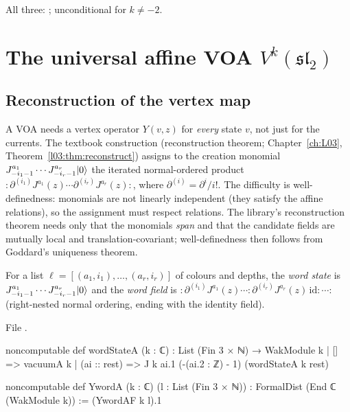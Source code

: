 \begin{status}
All three: \lean{[propext, Classical.}\allowbreak{}\allowbreak\lean{sound]}; unconditional for $k\ne-2$.
\end{status}

\section{The universal affine VOA \texorpdfstring{$V^k(\mathfrak{sl}_2)$}{V\^{}k(sl2)}}\label{l08:sec:voa}

\subsection{Reconstruction of the vertex map}

A VOA needs a vertex operator $Y(v,z)$ for \emph{every} state $v$, not just for the currents. The
textbook construction (reconstruction theorem; Chapter~\ref{ch:L03}, Theorem~\ref{l03:thm:reconstruct})
assigns to the creation monomial
$J^{a_1}_{-i_1-1}\cdots J^{a_r}_{-i_r-1}|0\rangle$ the iterated normal-ordered product
${:}\partial^{(i_1)}J^{a_1}(z)\cdots\partial^{(i_r)}J^{a_r}(z){:}$, where $\partial^{(i)} = \partial^i/i!$.
The difficulty is well-definedness: monomials are not linearly independent (they satisfy the affine
relations), so the assignment must respect relations. The library's reconstruction theorem needs
only that the monomials \emph{span} and that the candidate fields are mutually local and
translation-covariant; well-definedness then follows from Goddard's uniqueness theorem.

\begin{definition}\label{l08:def:words}
For a list $\ell = [(a_1,i_1),\ldots,(a_r,i_r)]$ of colours and depths, the \emph{word state} is
$J^{a_1}_{-i_1-1}\cdots J^{a_r}_{-i_r-1}|0\rangle$ and the \emph{word field} is
${:}\partial^{(i_1)}J^{a_1}(z)\cdots{:}\partial^{(i_r)}J^{a_r}(z)\,\mathrm{id}{:}\cdots{:}$ (right-nested
normal ordering, ending with the identity field).
\end{definition}

\noindent File .
\begin{leancode}
noncomputable def wordStateA (k : ℂ) : List (Fin 3 × ℕ) → WakModule k
  | [] => vacuumA k
  | (ai :: rest) => J k ai.1 (-(ai.2 : ℤ) - 1) (wordStateA k rest)

noncomputable def YwordA (k : ℂ) (l : List (Fin 3 × ℕ)) :
    FormalDist (End ℂ (WakModule k)) := (YwordAF k l).1
\end{leancode}

